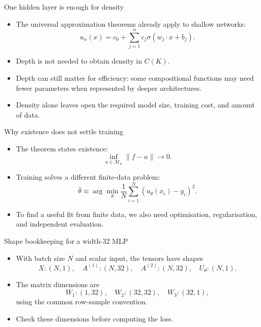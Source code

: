\documentclass[aspectratio=43,11pt]{beamer}
\newcommand{\slideid}{L2}
\newenvironment{slideitems}{\small\begin{itemize}\setlength\itemsep{0.45em}}{\end{itemize}}
\begin{document}
\renewcommand{\slideid}{L2-S34}
\begin{frame}[t]{One hidden layer is enough for density}
\begin{slideitems}
\item The universal approximation theorems already apply to shallow networks:
\[
 u_n(x)=c_0+\sum_{j=1}^n c_j\sigma(w_j\cdot x+b_j).
\]
\item Depth is not needed to obtain density in $C(K)$.
\item Depth can still matter for efficiency: some compositional functions may need fewer parameters when represented by deeper architectures.
\item Density alone leaves open the required model size, training cost, and amount of data.
\end{slideitems}
\end{frame}

\renewcommand{\slideid}{L2-S35}
\begin{frame}[t]{Why existence does not settle training}
\begin{slideitems}
\item The theorem states existence:
\[
 \inf_{u\in\mathcal M_n}\|f-u\|\to 0.
\]
\item Training solves a different finite-data problem:
\[
 \widehat\theta \approx \arg\min_\theta \frac1N\sum_{i=1}^N (u_\theta(x_i)-y_i)^2.
\]
\item To find a useful fit from finite data, we also need optimisation, regularisation, and independent evaluation.
\end{slideitems}
\end{frame}

\renewcommand{\slideid}{L2-S36}
\begin{frame}[t]{Shape bookkeeping for a width-32 MLP}
\begin{slideitems}
\item With batch size $N$ and scalar input, the tensors have shapes
\[
X:(N,1),\quad A^{(1)}:(N,32),\quad A^{(2)}:(N,32),\quad U_\theta:(N,1).
\]
\item The matrix dimensions are
\[
W_1:(1,32),\quad W_2:(32,32),\quad W_3:(32,1),
\]
using the common row-sample convention.
\item Check these dimensions before computing the loss.
\end{slideitems}
\end{frame}
\end{document}

